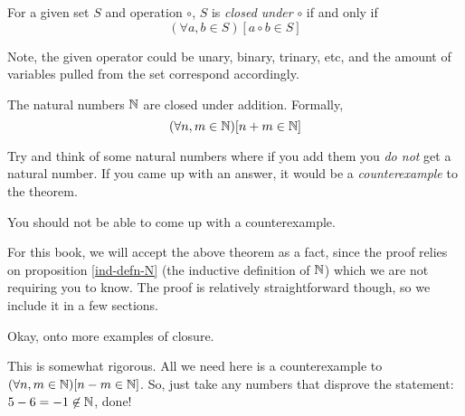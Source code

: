 \documentclass[main.tex]{subfiles}
\begin{document}
\begin{defn}
	For a given set \(S\) and operation \(\circ\), \(S\) is \textit{closed under} \(\circ\) if and only if \[(\forall a,b \in S)[a \circ b \in S]\]
	
	Note, the given operator could be unary, binary, trinary, etc, and the amount of variables pulled from the set correspond accordingly.
\end{defn}

\begin{thm}
	The natural numbers \(\mathbb{N}\) are closed under addition. Formally, \[(\forall n,m \in \mathbb{N})[n+m \in \mathbb{N}]\]
\end{thm}

\begin{example}
	Try and think of some natural numbers where if you add them you \textit{do not} get a natural number. If you came up with an answer, it would be a \textit{counterexample} to the theorem.
	
	You should not be able to come up with a counterexample.
\end{example}

\begin{rem}
	For this book, we will accept the above theorem as a fact, since the proof relies on proposition \ref{ind-defn-N} (the inductive definition of \(\mathbb{N}\)) which we are not requiring you to know. The proof is relatively straightforward though, so we include it in a few sections.
\end{rem}

Okay, onto more examples of closure.



\begin{rem}
	This is somewhat rigorous. All we need here is a counterexample to \((\forall n,m \in \mathbb{N})[n - m \in \mathbb{N}]\). So, just take any numbers that disprove the statement: \(5 - 6 = -1 \not\in \mathbb{N}\), done!
\end{rem}
\end{document}

